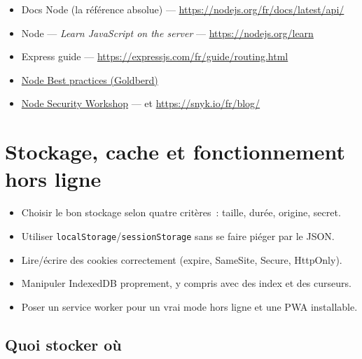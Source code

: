 \documentclass[12pt,a4paper,twoside,openright]{book}
\newcommand{\link}[2]{\href{#2}{#1}}
\begin{document}
\begin{ressources}
\begin{itemize}
  \item Docs Node (la r\'ef\'erence absolue) --- \url{https://nodejs.org/fr/docs/latest/api/}
  \item Node --- \emph{Learn JavaScript on the server} --- \url{https://nodejs.org/learn}
  \item Express guide --- \url{https://expressjs.com/fr/guide/routing.html}
  \item \link{Node Best practices (Goldberd)}{https://github.com/goldberio/express-nodejs-best-practices}
  \item \link{Node Security Workshop}{https://github.com/ThankyouForComing/Node-Security-Workshop} --- et \url{https://snyk.io/fr/blog/}
\end{itemize}
\end{ressources}

\chapter{Stockage, cache et fonctionnement hors ligne}
\label{ch-js-storage}

\begin{objectif}
\begin{itemize}
  \item Choisir le bon stockage selon quatre crit\`eres~: taille, dur\'ee, origine, secret.
  \item Utiliser \texttt{localStorage}/\texttt{sessionStorage} sans se faire pi\'eger par le JSON.
  \item Lire/\'ecrire des cookies correctement (expire, SameSite, Secure, HttpOnly).
  \item Manipuler IndexedDB proprement, y compris avec des index et des curseurs.
  \item Poser un service worker pour un vrai mode hors ligne et une PWA installable.
\end{itemize}
\end{objectif}

\section{Quoi stocker o\`u}
\end{document}
